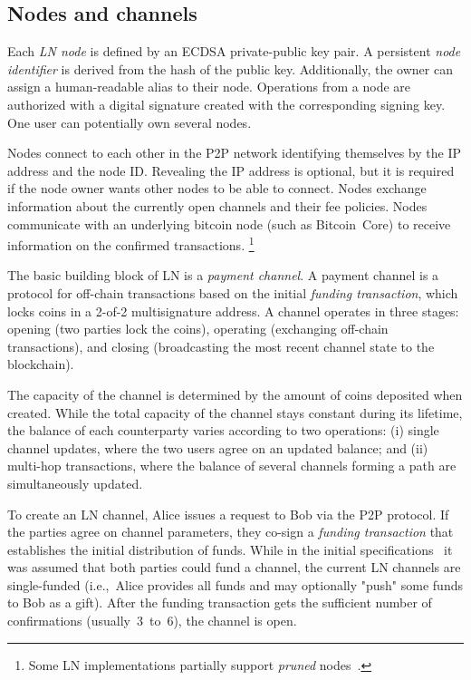 \subsection{Nodes and channels}

Each \textit{LN node} is defined by an ECDSA private-public key pair.
A persistent \textit{node identifier} is derived from the hash of the public key. 
Additionally, the owner can assign a human-readable alias to their node.
Operations from a node are authorized with a digital signature created with the corresponding signing key.
One user can potentially own several nodes.

Nodes connect to each other in the P2P network identifying themselves by the IP address and the node ID.
Revealing the IP address is optional, but it is required if the node owner wants other nodes to be able to connect.
Nodes exchange information about the currently open channels and their fee policies.
Nodes communicate with an underlying bitcoin node (such as Bitcoin~Core) to receive information on the confirmed transactions.
\footnote{Some LN implementations partially support \textit{pruned} nodes~\cite{LNDInstall}.}

The basic building block of LN is a \textit{payment channel}.
A payment channel is a protocol for off-chain transactions based on the initial \textit{funding transaction}, which locks coins in a 2-of-2 multisignature address.
A channel operates in three stages: opening (two parties lock the coins), operating (exchanging off-chain transactions), and closing (broadcasting the most recent channel state to the blockchain).

The capacity of the channel is determined by the amount of coins deposited when created.
While the total capacity of the channel stays constant during its lifetime,
the balance of each counterparty varies according to two operations:
(i) single channel updates, where the two users agree on an updated balance; and 
(ii) multi-hop transactions, where the balance 
of several channels forming a path are simultaneously updated. 

To create an LN channel, Alice issues a request to Bob via the P2P protocol.
If the parties agree on channel parameters, they co-sign a \textit{funding transaction} that establishes the initial distribution of funds.
While in the initial specifications~\cite{Poon2016} it was assumed that both parties could fund a channel, the current LN channels are single-funded (i.e.,~Alice provides all funds and may optionally "push" some funds to Bob as a gift).
After the funding transaction gets the sufficient number of confirmations (usually~$3$~to~$6$), the channel is open.



